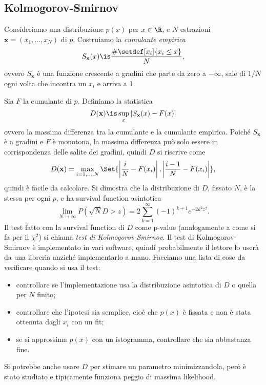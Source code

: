 \subsection{Kolmogorov-Smirnov}

Consideriamo una distribuzione $p(x)$ per $x\in\R$, e $N$ estrazioni
$\mathbf x = (x_1, \dots, x_N)$ di $p$. Costruiamo la \emph{cumulante empirica} 
\begin{equation*}
	S_{\mathbf x}(x)
	\is \frac {\#\setdef[x_i]{x_i\le x}} N,
\end{equation*}
ovvero $S_{\mathbf x}$ è una funzione crescente a gradini che parte da zero a $-\infty$,
sale di $1/N$ ogni volta che incontra un $x_i$ e arriva a 1.

Sia $F$ la cumulante di $p$. Definiamo la statistica
\begin{equation*}
	D(\mathbf x)
	\is \sup_x|S_\mathbf x(x)-F(x)|
\end{equation*}
ovvero la massima differenza tra la cumulante e la cumulante empirica. Poiché
$S_{\mathbf x}$ è a gradini e $F$ è monotona, la massima differenza può solo
essere in corrispondenza delle salite dei gradini, quindi $D$ si riscrive come
\begin{equation*}
	D(\mathbf x) = \max_{i=1,\dotsc,N}
    \Set{\left|\frac iN-F(x_i)\right|, \left|\frac{i-1}N-F(x_i)\right|},
\end{equation*}
quindi è facile da calcolare.
Si dimostra che la distribuzione di $D$, fissato $N$, è la stessa per ogni $p$,
e ha survival function asintotica
\begin{equation*}
	\lim_{N\to\infty} P(\sqrt N D>z)
	= 2 \sum_{k=1}^\infty (-1)^{k+1} e^{-2k^2z^2}.
\end{equation*}
Il test fatto con la survival function di $D$ come p-value (analogamente a come
si fa per il $\chi^2$) si chiama \emph{test di Kolmogorov-Smirnov}.
Il test di Kolmogorov-Smirnov è implementato in vari software, quindi
probabilmente il lettore lo userà da una libreria anziché implementarlo a mano.
Facciamo una lista di cose da verificare quando si usa il test:
\begin{itemize}
	\item controllare se l'implementazione usa la distribuzione asintotica di $D$ o quella per $N$ finito;
	\item controllare che l'ipotesi sia semplice,
	cioè che $p(x)$ è fissata e non è stata ottenuta dagli $x_i$ con un fit;
	\item se si approssima $p(x)$ con un istogramma, controllare che sia abbastanza fine.
\end{itemize}
Si potrebbe anche usare $D$ per stimare un parametro minimizzandola,
però è stato studiato e tipicamente funziona peggio di massima likelihood.
